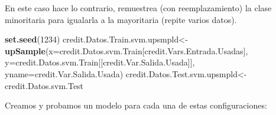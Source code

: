 \documentclass[
]{article}
\newenvironment{Shaded}{\begin{snugshade}}{\end{snugshade}}
\newcommand{\AttributeTok}[1]{\textcolor[rgb]{0.13,0.29,0.53}{#1}}
\newcommand{\DecValTok}[1]{\textcolor[rgb]{0.00,0.00,0.81}{#1}}
\newcommand{\FunctionTok}[1]{\textcolor[rgb]{0.13,0.29,0.53}{\textbf{#1}}}
\newcommand{\NormalTok}[1]{#1}
\newcommand{\OtherTok}[1]{\textcolor[rgb]{0.56,0.35,0.01}{#1}}
\begin{document}
En este caso hace lo contrario, remuestrea (con reemplazamiento) la
clase minoritaria para igualarla a la mayoritaria (repite varios datos).

\begin{Shaded}
\begin{Highlighting}[]
\FunctionTok{set.seed}\NormalTok{(}\DecValTok{1234}\NormalTok{)}
\NormalTok{credit.Datos.Train.svm.upsmpld}\OtherTok{\textless{}{-}}\FunctionTok{upSample}\NormalTok{(}\AttributeTok{x=}\NormalTok{credit.Datos.svm.Train[credit.Vars.Entrada.Usadas],}
                                   \AttributeTok{y=}\NormalTok{credit.Datos.svm.Train[[credit.Var.Salida.Usada]],}
                                   \AttributeTok{yname=}\NormalTok{credit.Var.Salida.Usada)}
\NormalTok{credit.Datos.Test.svm.upsmpld}\OtherTok{\textless{}{-}}\NormalTok{ credit.Datos.svm.Test}
\end{Highlighting}
\end{Shaded}

Creamos y probamos un modelo para cada una de estas configuraciones:
\end{document}
